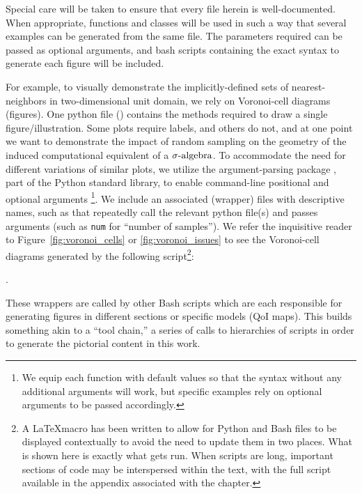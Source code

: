 Special care will be taken to ensure that every file herein is well-documented.
When appropriate, functions and classes will be used in such a way that several examples can be generated from the same file.
The parameters required can be passed as optional arguments, and bash scripts containing the exact syntax to generate each figure will be included.

For example, to visually demonstrate the implicitly-defined sets of nearest-neighbors in two-dimensional unit domain, we rely on Voronoi-cell diagrams (figures).
One python file () contains the methods required to draw a single figure/illustration.
Some plots require labels, and others do not, and at one point we want to demonstrate the impact of random sampling on the geometry of the induced computational equivalent of a $\sigma\text{-algebra}$.
To accommodate the need for different variations of similar plots, we utilize the argument-parsing package , part of the Python standard library, to enable command-line positional and optional arguments \footnote{We equip each function with default values so that the syntax  without any additional arguments will work, but specific examples rely on optional arguments to be passed accordingly.}.
We include an associated (wrapper) files with descriptive names, such as  that repeatedly call the relevant python file(s) and passes arguments (such as {\tt num} for ``number of samples''). 
We refer the inquisitive reader to  Figure~\ref{fig:voronoi_cells} or \ref{fig:voronoi_issues} to see the Voronoi-cell diagrams generated by the following script\footnote{A \LaTeX macro has been written to allow for Python and Bash files to be displayed contextually to avoid the need to update them in two places. What is shown here is exactly what gets run. When scripts are long, important sections of code may be interspersed within the text, with the full script available in the appendix associated with the chapter.}:

.

These wrappers are called by other Bash scripts which are each responsible for generating figures in different sections or specific models (QoI maps).
This builds something akin to a ``tool chain,'' a series of calls to hierarchies of scripts in order to generate the pictorial content in this work.

